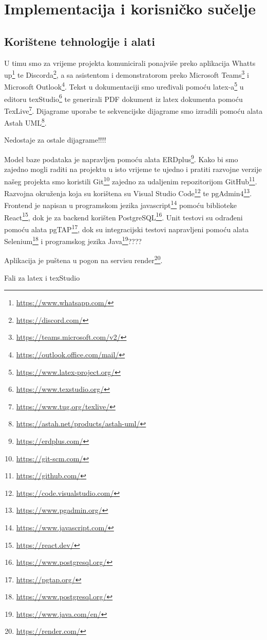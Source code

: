 \chapter{Implementacija i korisničko sučelje}
		
		
		\section{Korištene tehnologije i alati}

			 U timu smo za vrijeme projekta komunicirali ponajviše preko aplikacija Whatts up\footnote{\url{https://www.whatsapp.com/}} te Discorda\footnote{\url{https://discord.com/}}, a sa asistentom i demonstratorom preko Microsoft Teams\footnote{\url{https://teams.microsoft.com/v2/}} i Microsoft Outlook\footnote{\url{https://outlook.office.com/mail/}}. Tekst u dokumentaciji smo uređivali pomoću latex-a\footnote{\url{https://www.latex-project.org/}} u editoru texStudio\footnote{\url{https://www.texstudio.org/}} te generirali PDF dokument iz latex dokumenta pomoću TexLive\footnote{\url{https://www.tug.org/texlive/}}. Dijagrame uporabe te sekvencijske dijagrame smo izradili pomoću alata Astah UML\footnote{\url{https://astah.net/products/astah-uml/}}.
			 
			 Nedostaje za ostale dijagrame!!!!
			 
			 Model baze podataka je napravljen pomoću alata ERDplus\footnote{\url{https://erdplus.com/}}. Kako bi smo zajedno mogli raditi na projektu u isto vrijeme te ujedno i pratiti razvojne verzije našeg projekta smo koristili Git\footnote{\url{https://git-scm.com/}} zajedno za udaljenim repozitorijom GitHub\footnote{\url{https://github.com/}}. Razvojna okruženja koja su korištena su Visual Studio Code\footnote{\url{https://code.visualstudio.com/}} te pgAdmin4\footnote{\url{https://www.pgadmin.org/}}. Frontend je napisan u programskom jezika javascript\footnote{\url{https://www.javascript.com/}} pomoću biblioteke React\footnote{\url{https://react.dev/}}, dok je za backend korišten PostgreSQL\footnote{\url{https://www.postgresql.org/}}. Unit testovi su odrađeni pomoću alata pgTAP\footnote{\url{https://pgtap.org/}}, dok su integracijski testovi napravljeni pomoću alata Selenium\footnote{\url{https://www.postgresql.org/}} i programskog  jezika Java\footnote{\url{https://www.java.com/en/}}????
			 
			 Aplikacija je puštena u pogon na servisu render\footnote{\url{https://render.com/}}.
			 
			 Fali za latex i texStudio
			
